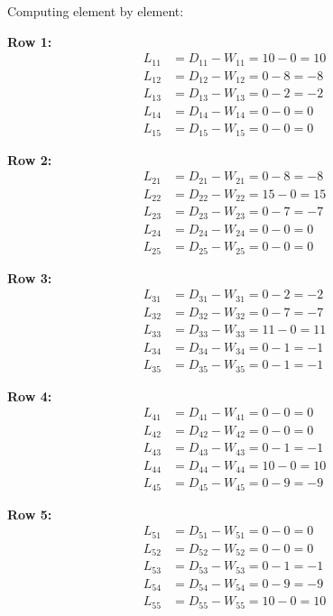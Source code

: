 \documentclass[12pt]{article}
\begin{document}
\begin{solution}
Computing element by element:

\textbf{Row 1:}
\begin{align*}
L_{11} &= D_{11} - W_{11} = 10 - 0 = 10 \\
L_{12} &= D_{12} - W_{12} = 0 - 8 = -8 \\
L_{13} &= D_{13} - W_{13} = 0 - 2 = -2 \\
L_{14} &= D_{14} - W_{14} = 0 - 0 = 0 \\
L_{15} &= D_{15} - W_{15} = 0 - 0 = 0
\end{align*}

\textbf{Row 2:}
\begin{align*}
L_{21} &= D_{21} - W_{21} = 0 - 8 = -8 \\
L_{22} &= D_{22} - W_{22} = 15 - 0 = 15 \\
L_{23} &= D_{23} - W_{23} = 0 - 7 = -7 \\
L_{24} &= D_{24} - W_{24} = 0 - 0 = 0 \\
L_{25} &= D_{25} - W_{25} = 0 - 0 = 0
\end{align*}

\textbf{Row 3:}
\begin{align*}
L_{31} &= D_{31} - W_{31} = 0 - 2 = -2 \\
L_{32} &= D_{32} - W_{32} = 0 - 7 = -7 \\
L_{33} &= D_{33} - W_{33} = 11 - 0 = 11 \\
L_{34} &= D_{34} - W_{34} = 0 - 1 = -1 \\
L_{35} &= D_{35} - W_{35} = 0 - 1 = -1
\end{align*}

\textbf{Row 4:}
\begin{align*}
L_{41} &= D_{41} - W_{41} = 0 - 0 = 0 \\
L_{42} &= D_{42} - W_{42} = 0 - 0 = 0 \\
L_{43} &= D_{43} - W_{43} = 0 - 1 = -1 \\
L_{44} &= D_{44} - W_{44} = 10 - 0 = 10 \\
L_{45} &= D_{45} - W_{45} = 0 - 9 = -9
\end{align*}

\textbf{Row 5:}
\begin{align*}
L_{51} &= D_{51} - W_{51} = 0 - 0 = 0 \\
L_{52} &= D_{52} - W_{52} = 0 - 0 = 0 \\
L_{53} &= D_{53} - W_{53} = 0 - 1 = -1 \\
L_{54} &= D_{54} - W_{54} = 0 - 9 = -9 \\
L_{55} &= D_{55} - W_{55} = 10 - 0 = 10
\end{align*}


\end{solution}
\end{document}
